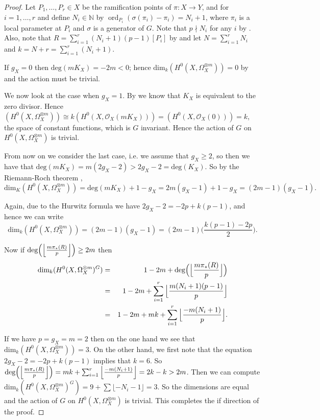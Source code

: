 \documentclass[11pt]{article} %
\DeclareMathOperator{\ord}{ord}
\begin{document}
\begin{proof}

Let $P_1,\ldots ,P_r\in X$ be the ramification points of $\pi:X\rightarrow Y$, and for $i=1,\ldots ,r$  and define $N_i\in \mathbb{N}$ by $\ord_{P_i}(\sigma(\pi_i)-\pi_i)=N_i+1$, where $\pi_i$ is a local parameter at $P_i$ and $\sigma$ is a generator of $G$. Note that $p\nmid N_i$ for any $i$ by \citep[Lem. 1, pg. 87]{naka}. Also, note that $R=\sum_{i=1}^r(N_i+1)(p-1)[P_i]$ by \citep[Prop. 4, {\S}1, Ch. IV]{localfields} and let $N=\sum_{i=1}^rN_i$ and $k=N+r=\sum_{i=1}^r(N_i+1)$.

If $g_X=0$ then $\mbox{deg}(mK_X)=-2m<0$; hence $\mbox{dim}_k(H^0(X,\Omega_X^{\otimes m}))=0$ by \citep[prop. 3, {\S}8]{fulton} and the action must be trivial.

We now look at the case when $g_X=1$. By \citep[Chap. IV,\ Example 1.3.6]{hart} we know that $K_X$ is equivalent to the zero divisor. Hence $(H^0(X,\Omega_X^{\otimes m}))\cong k(H^0(X,\mathscr{O}_X(mK_X)))=(H^0(X,\mathscr{O}_X(0)))=k$, the space of constant functions, which is $G$ invariant. Hence the action of $G$ on $H^0(X,\Omega_X^{\otimes m})$ is trivial.

From now on we consider the last case, i.e. we assume that $g_X\geq 2$, so then we have that $\mbox{deg}(mK_X)=m(2g_X-2)>2g_X-2=\mbox{deg}(K_X)$. So by the Riemann-Roch theorem \citep[Cor. 2, {\S}8]{fulton},
	\[
		\mbox{dim}_K(H^0(X,\Omega_X^{\otimes m}))=\mbox{deg}(mK_X)+1-g_X=2m(g_X-1)+1-g_X=(2m-1)(g_X-1).
	\]

Again, due to the Hurwitz formula we have $2g_X-2=-2p+k(p-1)$, and hence we can write
	\[
		\mbox{dim}_k(H^0(X,\Omega_X^{\otimes m}))=(2m-1)(g_X-1)=(2m-1)\Big(\frac{k(p-1)-2p}					{2}\Big).
	\]

Now if $\mbox{deg}\Big(\Big{\lfloor}{\frac{m\pi_*(R)}{p}}\Big{\rfloor}\Big)\geq 2m$ then
	\begin{eqnarray*}	
			\mbox{dim}_k(H^0(X,\Omega_X^{\otimes m})^G) & = & 1-2m+\mbox{deg}\Big(\Big{\lfloor}							{\frac{m\pi_*(R)}{p}}\Big{\rfloor}\Big) \\
			&= & 1-2m+\sum_{i=1}^r \Big{\lfloor}{\frac{m(N_i+1)(p-1)}{p}}\Big{\rfloor} \\
			&= & 1-2m+mk+\sum_{i=1}^r\Big{\lfloor}{\frac{-m(N_i+1)}{p}}\Big{\rfloor}. 
	\end{eqnarray*}
	
If we have $p=g_X=m=2$ then on the one hand we see that $\mbox{dim}_k(H^0(X,\Omega_X^{\otimes m}))=3$. On the other hand, we first note that the equation $2g_X-2=-2p+k(p-1)$ implies that $k=6$. So $\mbox{deg}\Big(\Big{\lfloor}{\frac{m\pi_*(R)}{p}}\Big{\rfloor}\Big)=mk+\sum_{i=1}^r\Big{\lfloor}{\frac{-m(N_i+1)}{p}}\Big{\rfloor}=2k-k>2m$. Then we can compute $\mbox{dim}_k(H^0(X,\Omega_X^{\otimes m})^G)=9+\sum\lfloor-N_i-1\rfloor=3$. So the dimensions are equal and the action of $G$ on $H^0(X,\Omega_X^{\otimes m})$ is trivial. This completes the if direction of the proof.


\end{proof}
\end{document}
